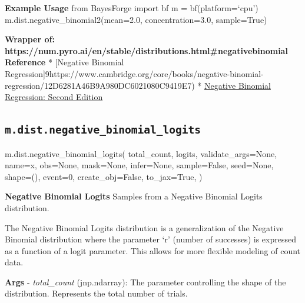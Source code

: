 \documentclass[
  letterpaper,
  DIV=11,
  numbers=noendperiod]{scrartcl}
\newenvironment{Shaded}{\begin{snugshade}}{\end{snugshade}}
\newcommand{\DecValTok}[1]{\textcolor[rgb]{0.68,0.00,0.00}{#1}}
\newcommand{\NormalTok}[1]{\textcolor[rgb]{0.00,0.23,0.31}{#1}}
\newcommand{\OperatorTok}[1]{\textcolor[rgb]{0.37,0.37,0.37}{#1}}
\newcommand{\StringTok}[1]{\textcolor[rgb]{0.13,0.47,0.30}{#1}}
\newcommand{\VariableTok}[1]{\textcolor[rgb]{0.07,0.07,0.07}{#1}}
\begin{document}
\textbf{Example Usage} from BayesForge import bf m = bf(platform=`cpu')
m.dist.negative\_binomial2(mean=2.0, concentration=3.0, sample=True)

\textbf{Wrapper of:
https://num.pyro.ai/en/stable/distributions.html\#negativebinomial}
\textbf{Reference} * {[}Negative Binomial
Regression{]}9https://www.cambridge.org/core/books/negative-binomial-regression/12D6281A46B9A980DC6021080C9419E7)
*
\href{https://assets.cambridge.org/97805211/98158/excerpt/9780521198158_excerpt.pdf}{Negative
Binomial Regression: Second Edition}

\subsection{\texorpdfstring{\texttt{m.dist.negative\_binomial\_logits}}{m.dist.negative\_binomial\_logits}}\label{negative_binomial_logits}

\begin{Shaded}
\begin{Highlighting}[]
\NormalTok{m.dist.negative\_binomial\_logits(}
\NormalTok{    total\_count,}
\NormalTok{    logits,}
\NormalTok{    validate\_args}\OperatorTok{=}\VariableTok{None}\NormalTok{,}
\NormalTok{    name}\OperatorTok{=}\StringTok{\textquotesingle{}x\textquotesingle{}}\NormalTok{,}
\NormalTok{    obs}\OperatorTok{=}\VariableTok{None}\NormalTok{,}
\NormalTok{    mask}\OperatorTok{=}\VariableTok{None}\NormalTok{,}
\NormalTok{    infer}\OperatorTok{=}\VariableTok{None}\NormalTok{,}
\NormalTok{    sample}\OperatorTok{=}\VariableTok{False}\NormalTok{,}
\NormalTok{    seed}\OperatorTok{=}\VariableTok{None}\NormalTok{,}
\NormalTok{    shape}\OperatorTok{=}\NormalTok{(),}
\NormalTok{    event}\OperatorTok{=}\DecValTok{0}\NormalTok{,}
\NormalTok{    create\_obj}\OperatorTok{=}\VariableTok{False}\NormalTok{,}
\NormalTok{    to\_jax}\OperatorTok{=}\VariableTok{True}\NormalTok{,}
\NormalTok{)}
\end{Highlighting}
\end{Shaded}

\textbf{Negative Binomial Logits} Samples from a Negative Binomial
Logits distribution.

The Negative Binomial Logits distribution is a generalization of the
Negative Binomial distribution where the parameter `r' (number of
successes) is expressed as a function of a logit parameter. This allows
for more flexible modeling of count data.

\textbf{Args} - \emph{total\_count} (jnp.ndarray): The parameter
controlling the shape of the distribution. Represents the total number
of trials.
\end{document}
